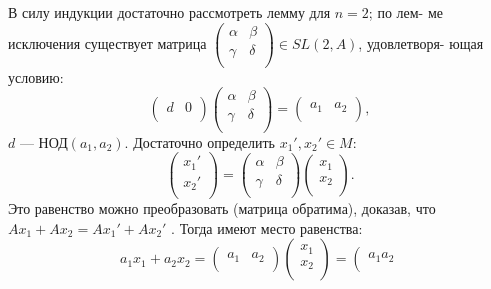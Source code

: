 \begin{myproof}
В силу индукции достаточно рассмотреть лемму для $n=2$; по лем- \linebreak ме исключения существует матрица ${\left( \begin{array}{ccc}
\alpha & \beta \\
\gamma & \delta \\
\end{array} \right)} \in SL(2,A)$, удовлетворя- \linebreak ющая условию:  
$${\left( \begin{array}{ccc}
d & 0 \\
\end{array} \right)}{\left( \begin{array}{ccc}
\alpha & \beta \\
\gamma & \delta \\
\end{array} \right)}={\left( \begin{array}{ccc}
a_1 & a_2 \\
\end{array} \right)},$$
$d$ — НОД$(a_1, a_2)$. Достаточно определить $x_1', x_2' \in M$:
$${\left( \begin{array}{ccc}
x_1' \\
x_2' \\
\end{array} \right)}={\left( \begin{array}{ccc}
\alpha & \beta \\
\gamma & \delta \\
\end{array} \right)}{\left( \begin{array}{ccc}
x_1 \\
x_2 \\
\end{array} \right)}.$$
Это равенство можно преобразовать (матрица обратима), доказав, \linebreak что $Ax_1+ Ax_2= Ax_1' + Ax_2'$ . Тогда имеют место равенства:  
$$a_1x_1 + a_2x_2 = {\left( \begin{array}{ccc}
a_1 & a_2 \\
\end{array} \right)}{\left( \begin{array}{ccc}
x_1 \\
x_2 \\
\end{array} \right)} = {\left( \begin{array}{ccc}
a_1 a_2 \\

\end{array}}$$
\end{myproof}

